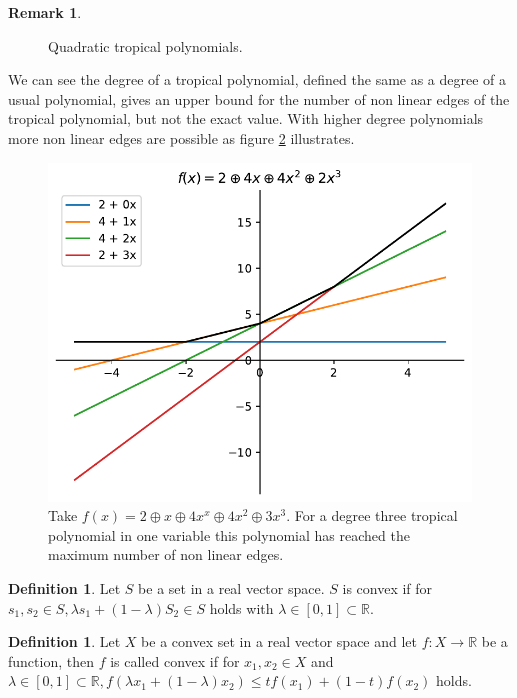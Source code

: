 \documentclass{article}
\theoremstyle{definition}
\newtheorem{definition}[theorem]{Definition}
\newtheorem{remark}[theorem]{Remark}
\begin{document}
\begin{remark}
\begin{figure}[h]
\caption{Quadratic tropical polynomials.}
\label{fig:image2}
\end{figure}

We can see the degree of a tropical polynomial, defined the same as a degree of a usual polynomial, gives an upper bound for the number of non linear edges of the tropical polynomial, but not the exact value. With higher degree polynomials more non linear edges are possible as figure \ref{fig:trop_qub} illustrates.


\begin{figure}[h]
\centering
\includegraphics[scale=0.75]{graphics/third_trop_pol.pdf}
\caption{Take $f(x)=2 \oplus x \oplus 4x^{x} \oplus 4x^{2} \oplus 3x^{3}$. For a degree three tropical polynomial in one variable this polynomial has reached the maximum number of non linear edges.}
\label{fig:trop_qub}
\end{figure}
\end{remark}

\begin{definition}
Let $S$ be a set in a real vector space. $S$ is convex if for $s_{1}, s_{2} \in S, \lambda s_{1} + (1-\lambda) S_{2} \in S$ holds with $\lambda \in [0,1] \subset \mathbb{R}$.
\end{definition}

\begin{definition}
Let $X$ be a convex set in a real vector space and let $f:X \to \mathbb{R}$ be a function, then $f$ is called convex if for $x_{1}, x_{2} \in X$ and $\lambda \in [0,1] \subset \mathbb{R}, f(\lambda x_{1} + (1-\lambda)x_{2}) \leq tf(x_{1}) + (1-t)f(x_{2})$ holds.
\end{definition}
\end{document}
